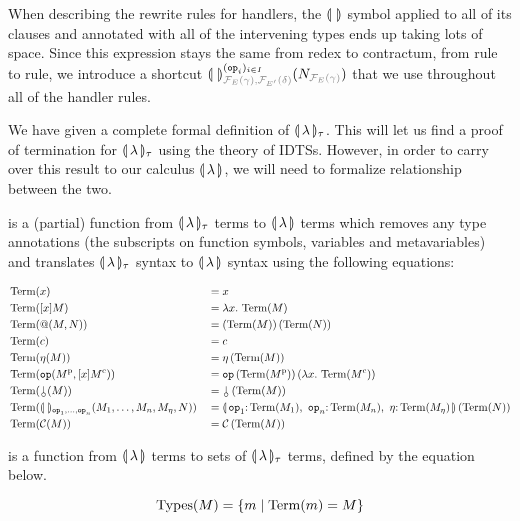 When describing the rewrite rules for handlers, the $\llparenthesis \,  \, \rrparenthesis$ symbol
applied to all of its clauses and annotated with all of the intervening
types ends up taking lots of space. Since this expression stays the same
from redex to contractum, from rule to rule, we introduce a shortcut
$\banana{}^{(\op{op}_i)_{i \in
    I}}_{\typehint{\FF_E(\gamma),\FF_{E'}(\delta)}}(N_{\typehint{\FF_E(\gamma)}})$
that we use throughout all of the handler rules.

We have given a complete formal definition of $\llparenthesis \, \lambda \, \rrparenthesis_\tau$. This
will let us find a proof of termination for $\llparenthesis \, \lambda \, \rrparenthesis_\tau$ using
the theory of IDTSs. However, in order to carry over this result to our
calculus $\llparenthesis \, \lambda \, \rrparenthesis$, we will need to formalize relationship between
the two.

\begin{definition}
   is a (partial) function from $\llparenthesis \, \lambda \, \rrparenthesis_\tau$ terms
  to $\llparenthesis \, \lambda \, \rrparenthesis$ terms which removes any type annotations (the
  subscripts on function symbols, variables and metavariables) and
  translates $\llparenthesis \, \lambda \, \rrparenthesis_\tau$ syntax to $\llparenthesis \, \lambda \, \rrparenthesis$ syntax
  using the following equations:
  
  \begin{align*}
    & \Term(x) &&= x \\
    & \Term([x] M) &&= \lam{x}{\Term(M)} \\
    & \Term(@(M, N)) &&= \ap{(\Term(M))}{(\Term(N))} \\
    & \Term(c) &&= c \\
    & \Term(\eta(M)) &&= \etaE{(\Term(M))} \\
    & \Term(\op{op}(M^{\mathrm{p}}, [x] M^{\mathrm{c}})) &&= \app{\op{op}}{(\Term(M^{\mathrm{p}}))}{(\lam{x}{\Term(M^{\mathrm{c}})})} \\
    & \Term(\cherry(M)) &&= \ap{\cherry}{(\Term(M))} \\
    & \Term(\banana{}_{\op{op}_1, \ldots, \op{op}_n}(M_1, \ldots, M_n, M_\eta, N)) &&= \ap{\banana{\onto{\op{op}_1}{\Term(M_1)},\ \onto{\op{op}_n}{\Term(M_n)},\ \onto{\eta}{\Term(M_\eta)}}}{(\Term(N))} \\
    & \Term(\CC(M)) &&= \ap{\CC}{(\Term(M))}
  \end{align*}
\end{definition}

\begin{definition}
   is a function from $\llparenthesis \, \lambda \, \rrparenthesis$ terms to sets of
  $\llparenthesis \, \lambda \, \rrparenthesis_\tau$ terms, defined by the equation below.
  
  $$
  \operatorname{Types}(M) = \{ m \mid \operatorname{Term}(m) = M \}
  $$
\end{definition}

